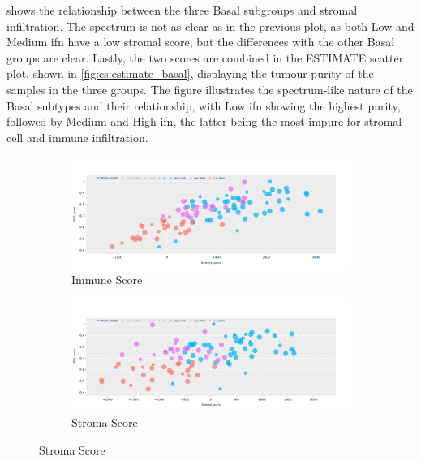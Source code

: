  shows the relationship between the three Basal subgroups and stromal infiltration. The spectrum is not as clear as in the previous plot, as both Low and Medium \acrshort{ifn} have a low stromal score, but the differences with the other Basal groups are clear. Lastly, the two scores are combined in the ESTIMATE scatter plot, shown in \cref{fig:cs:estimate_basal}, displaying the tumour purity of the samples in the three groups. The figure illustrates the spectrum-like nature of the Basal subtypes and their relationship, with Low \acrshort{ifn} showing the highest purity, followed by Medium and High \acrshort{ifn}, the latter being the most impure for stromal cell and immune infiltration. 



\begin{figure}[H]
    \centering
    \begin{subfigure}[!t]{1.0\textwidth}
        \includegraphics[width=\textwidth,keepaspectratio]{Sections/ClusteringAnalysis/Resources/discussion/Immune_spectrum.png}    
        \caption{Immune Score}
        \label{fig:cs:immune_basal}
    \end{subfigure}
    \centering
    \begin{subfigure}[!t]{1.0\textwidth}
        \includegraphics[width=\textwidth,keepaspectratio]{Sections/ClusteringAnalysis/Resources/discussion/Stroma_spectrum.png}
        \caption{Stroma Score}
        \label{fig:cs:stroma_basal}
    \end{subfigure} 

\end{figure}
